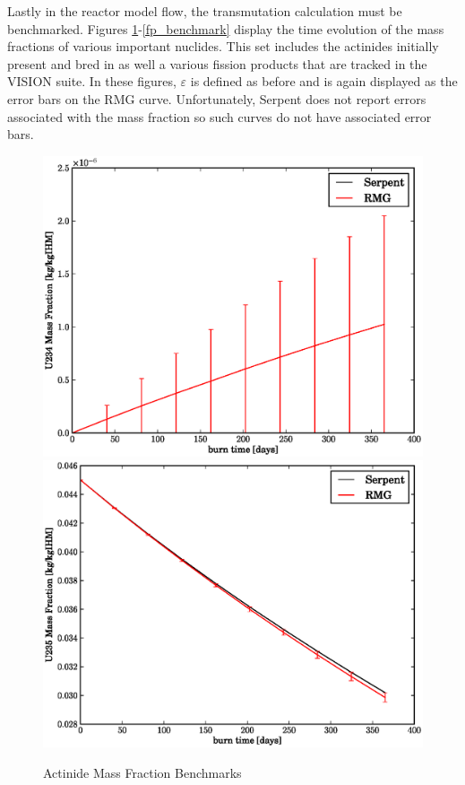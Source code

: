 Lastly in the reactor model flow, the transmutation calculation must be benchmarked.
Figures \ref{act_benchmark}-\ref{fp_benchmark} display the time evolution of the mass 
fractions of various important nuclides. This set includes the actinides initially present and 
bred in as well a various fission products that are tracked in the VISION suite.  
In these figures, $\varepsilon$ is defined as before and is again displayed as the error bars on 
the RMG curve.   Unfortunately, Serpent does not report errors associated with the mass fraction 
so such curves do not have associated error bars.

\begin{figure}[htbp]
\caption{Actinide Mass Fraction Benchmarks}
\label{act_benchmark}
\begin{center}
\includegraphics[scale=0.3]{multigroup_method/figs/benchmark/U234_Mass_Fraction_.eps}
\includegraphics[scale=0.3]{multigroup_method/figs/benchmark/U235_Mass_Fraction_.eps}

\end{center}
\end{figure}
